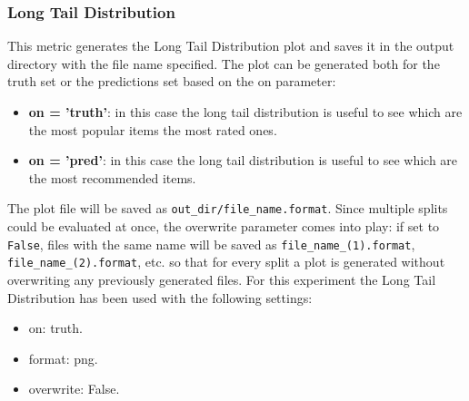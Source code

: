 \documentclass[11pt]{article}
\begin{document}
\subsubsection{Long Tail Distribution}\label{subsubsec:ltd}
This metric generates the Long Tail Distribution plot and saves it in the output directory with the file name
specified.
The plot can be generated both for the truth set or the predictions set based on the on parameter:
\begin{itemize}
    \item \textbf{on = 'truth'}: in this case the long tail distribution is useful to see which are the most popular items
       the most rated ones.
    \item \textbf{on = 'pred'}: in this case the long tail distribution is useful to see which are the most recommended
        items.
\end{itemize}
\hfill\break
\hfill\break
The plot file will be saved as \texttt{out\_dir/file\_name.format}.
Since multiple splits could be evaluated at once, the overwrite parameter comes into play:
if set to \texttt{False}, files with the same name will be saved as \texttt{file\_name\_(1).format}, \texttt{file\_name\_(2).format}, etc.
so that for every split a plot is generated without overwriting any previously generated files.
\hfill\break
\hfill\break
For this experiment the Long Tail Distribution has been used with the following settings:
\begin{itemize}
    \item on: truth.
    \item format: png.
    \item overwrite: False.
\end{itemize}
\hfill\break
\hfill\break


\end{document}
